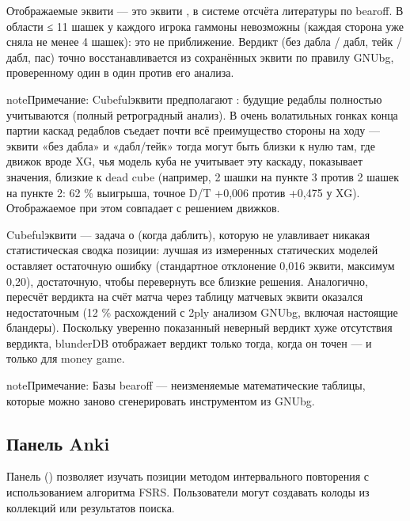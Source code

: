 \documentclass[letterpaper,10pt,russian]{sphinxmanual}
\begin{document}
\sphinxAtStartPar
{} Отображаемые эквити — это эквити , в системе отсчёта литературы по bearoff. В области ≤ 11 шашек у каждого игрока гаммоны невозможны (каждая сторона уже сняла не менее 4 шашек): это не приближение. Вердикт (без дабла / дабл, тейк / дабл, пас) точно восстанавливается из сохранённых эквити по правилу GNUbg, проверенному один в один против его анализа.

\begin{sphinxadmonition}{note}{Примечание:}
\sphinxAtStartPar
Cubeful\sphinxhyphen{}эквити предполагают : будущие редаблы полностью учитываются (полный ретроградный анализ). В очень волатильных гонках конца партии каскад редаблов съедает почти всё преимущество стороны на ходу — эквити «без дабла» и «дабл/тейк» тогда могут быть близки к нулю там, где движок вроде XG, чья модель куба не учитывает эту каскаду, показывает значения, близкие к dead cube (например, 2 шашки на пункте 3 против 2 шашек на пункте 2: 62 \% выигрыша, точное D/T +0,006 против +0,475 у XG). Отображаемое  при этом совпадает с решением движков.
\end{sphinxadmonition}

\sphinxAtStartPar
{} Cubeful\sphinxhyphen{}эквити — задача о  (когда даблить), которую не улавливает никакая статистическая сводка позиции: лучшая из измеренных статических моделей оставляет остаточную ошибку (стандартное отклонение 0,016 эквити, максимум 0,20), достаточную, чтобы перевернуть все близкие решения. Аналогично, пересчёт вердикта на счёт матча через таблицу матчевых эквити оказался недостаточным (12 \% расхождений с 2\sphinxhyphen{}ply анализом GNUbg, включая настоящие бландеры). Поскольку уверенно показанный неверный вердикт хуже отсутствия вердикта, blunderDB отображает вердикт только тогда, когда он точен — и только для money game.

\begin{sphinxadmonition}{note}{Примечание:}
\sphinxAtStartPar
Базы bearoff — неизменяемые математические таблицы, которые можно заново сгенерировать инструментом  из GNUbg.
\end{sphinxadmonition}


\subsection{Панель Anki}
\label{\detokenize{manuel:panneau-anki}}\label{\detokenize{manuel:id10}}
\sphinxAtStartPar
Панель  () позволяет изучать позиции методом интервального повторения с использованием алгоритма FSRS. Пользователи могут создавать колоды из коллекций или результатов поиска.
\end{document}
